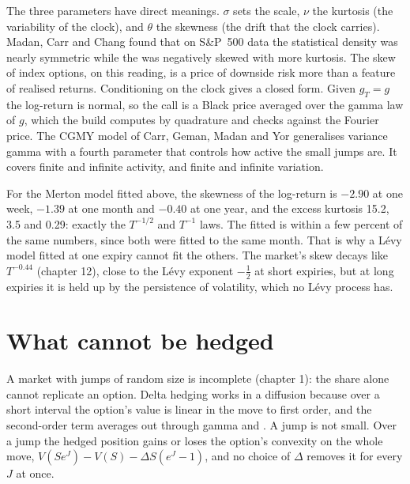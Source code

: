 The three parameters have direct meanings. $\sigma$ sets the scale, $\nu$ the kurtosis (the variability of the
clock), and $\theta$ the skewness (the drift that the clock carries). Madan, Carr and Chang found that on
S\&P~500 data the statistical density was nearly symmetric while the  was negatively skewed
with more kurtosis. The skew of index options, on this reading, is a price of downside risk more than a
feature of realised returns. Conditioning on the clock gives a closed form. Given $g_T=g$ the log-return is
normal, so the call is a Black price averaged over the gamma law of $g$, which the build computes by quadrature
and checks against the Fourier price. The CGMY model of Carr, Geman, Madan and Yor generalises variance gamma
with a fourth parameter that controls how active the small jumps are. It covers finite and infinite activity,
and finite and infinite variation.

\begin{example}\label{ex:dv:jumps-and-levy-models:moments}
For the Merton model fitted above, the skewness of the log-return is $-2.90$ at one week, $-1.39$ at one month
and $-0.40$ at one year, and the excess kurtosis 15.2, 3.5 and 0.29: exactly the $T^{-1/2}$ and $T^{-1}$ laws. The
fitted  is within a few percent of the same numbers, since both were fitted to the same
month. That is why a Lévy model fitted at one expiry cannot fit the others. The market's skew decays like
$T^{-0.44}$ (chapter 12), close to the Lévy exponent $-\frac12$ at short expiries, but at long expiries it is held
up by the persistence of volatility, which no Lévy process has.
\end{example}

\section{What cannot be hedged}

A market with jumps of random size is incomplete (chapter 1): the share alone cannot replicate an option.
Delta hedging works in a diffusion because over a short interval the option's value is linear in the move to
first order, and the second-order term averages out through gamma and . A jump is not small. Over a jump
the hedged position gains or loses the option's convexity on the whole move,
$V(Se^J)-V(S)-\Delta S(e^J-1)$, and no choice of $\Delta$ removes it for every $J$ at once.

